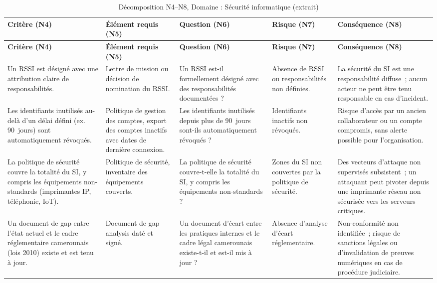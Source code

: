 \small
\begin{longtable}{p{2.8cm}p{2.7cm}p{2.7cm}p{2.4cm}p{2.6cm}}
\caption{Décomposition N4--N8, Domaine : Sécurité informatique (extrait)} \\
\toprule
\textbf{Critère (N4)} & \textbf{Élément requis (N5)} & \textbf{Question (N6)} & \textbf{Risque (N7)} & \textbf{Conséquence (N8)} \\
\midrule
\endfirsthead
\toprule
\textbf{Critère (N4)} & \textbf{Élément requis (N5)} & \textbf{Question (N6)} & \textbf{Risque (N7)} & \textbf{Conséquence (N8)} \\
\midrule
\endhead
\bottomrule
\endlastfoot

Un RSSI est désigné avec une attribution claire de responsabilités. &
Lettre de mission ou décision de nomination du RSSI. &
Un RSSI est-il formellement désigné avec des responsabilités documentées ? &
Absence de RSSI ou responsabilités non définies. &
La sécurité du SI est une responsabilité diffuse~; aucun acteur ne peut être tenu responsable en cas d'incident. \\
\addlinespace

Les identifiants inutilisés au-delà d'un délai défini (ex. 90~jours) sont automatiquement révoqués. &
Politique de gestion des comptes, export des comptes inactifs avec dates de dernière connexion. &
Les identifiants inutilisés depuis plus de 90~jours sont-ils automatiquement révoqués ? &
Identifiants inactifs non révoqués. &
Risque d'accès par un ancien collaborateur ou un compte compromis, sans alerte possible pour l'organisation. \\
\addlinespace

La politique de sécurité couvre la totalité du SI, y compris les équipements non-standards (imprimantes IP, téléphonie, IoT). &
Politique de sécurité, inventaire des équipements couverts. &
La politique de sécurité couvre-t-elle la totalité du SI, y compris les équipements non-standards ? &
Zones du SI non couvertes par la politique de sécurité. &
Des vecteurs d'attaque non supervisés subsistent~; un attaquant peut pivoter depuis une imprimante réseau non sécurisée vers les serveurs critiques. \\
\addlinespace

Un document de gap entre l'état actuel et le cadre réglementaire camerounais (lois 2010) existe et est tenu à jour. &
Document de gap analysis daté et signé. &
Un document d'écart entre les pratiques internes et le cadre légal camerounais existe-t-il et est-il mis à jour ? &
Absence d'analyse d'écart réglementaire. &
Non-conformité non identifiée~; risque de sanctions légales ou d'invalidation de preuves numériques en cas de procédure judiciaire. \\

\end{longtable}


